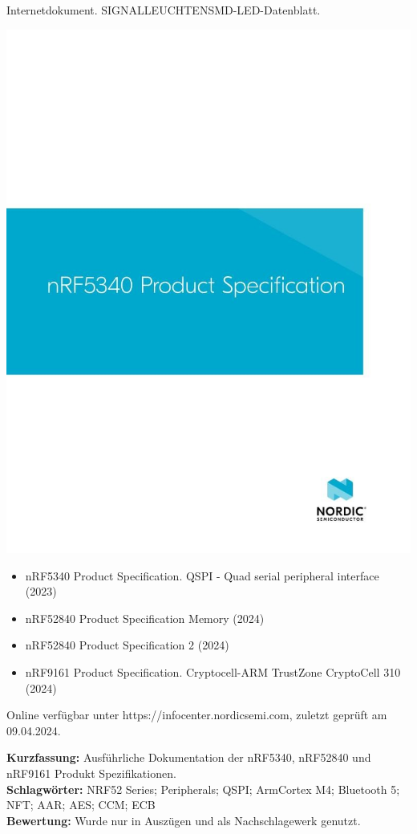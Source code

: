 {
Internetdokument. SIGNALLEUCHTENSMD-LED-Datenblatt. \\
\begin{minipage}{0.38\textwidth}
	\includegraphics[width=\linewidth]{images/Nordic.jpg}
\end{minipage}
\hfill
\begin{minipage}{0.6\textwidth}
\begin{itemize}
	\item nRF5340 Product Specification. QSPI - Quad serial peripheral interface (2023)
	\item nRF52840 Product Specification Memory (2024)
	\item nRF52840 Product Specification 2 (2024)
	\item nRF9161 Product Specification. Cryptocell-ARM TrustZone CryptoCell 310 (2024)
\end{itemize}
Online verfügbar unter https://infocenter.nordicsemi.com, zuletzt geprüft am 09.04.2024.
\end{minipage}
\textbf{Kurzfassung:}
Ausführliche Dokumentation der nRF5340, nRF52840 und nRF9161 Produkt Spezifikationen.
\\ \textbf{Schlagwörter:}
NRF52 Series; Peripherals; QSPI; ArmCortex M4; Bluetooth 5; NFT; AAR; AES; CCM; ECB
\\ \textbf{Bewertung:}
Wurde nur in Auszügen und als Nachschlagewerk genutzt. 
}

